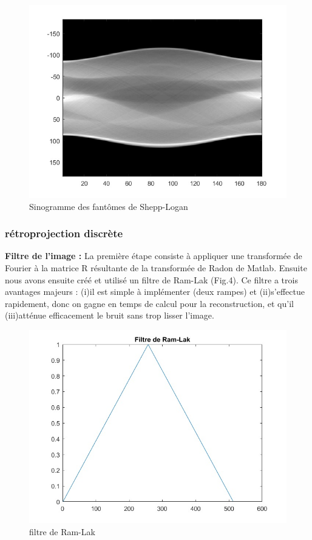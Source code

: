 \documentclass[conference]{IEEEtran}
\begin{document}
\begin{figure}[H]
\centering
\includegraphics[scale=0.5]{sinogramme}
\caption[Sinogramme des fantômes de Shepp-Logan]{Sinogramme des fantômes de Shepp-Logan}
\label{fig:gallery}
\end{figure}



\subsubsection{rétroprojection discrète }

\textbf{Filtre de l'image :} La première étape consiste à appliquer une transformée de Fourier à la matrice R résultante de la transformée de Radon de Matlab. Ensuite nous avons ensuite créé et utilisé un filtre de Ram-Lak (Fig.4). Ce filtre a trois avantages majeurs : (i)il est simple à implémenter (deux rampes) et (ii)s'effectue rapidement, donc on gagne en temps de calcul pour la reconstruction, et qu'il (iii)atténue efficacement le bruit sans trop lisser l'image.

\begin{figure}[H]
\centering
\includegraphics[scale=0.4]{filtre-de-Ram-Lak}
\caption[filtre de Ram-Lak]{filtre de Ram-Lak}
\label{fig:gallery}
\end{figure}
\end{document}
